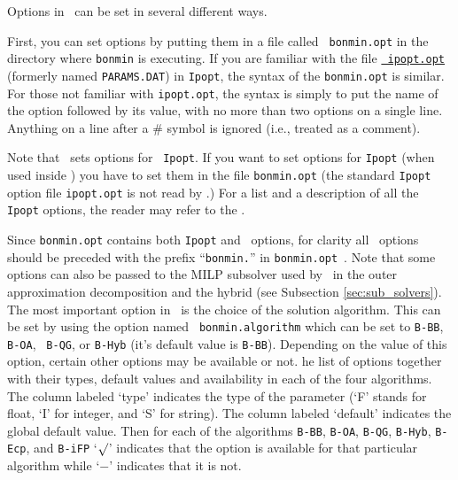 
\begin{PageSummary}
\end{PageSummary}


Options in \Bonmin\ can be set in several different ways.

First, you can set options by putting them in a file called {\tt
bonmin.opt} in the directory where {\tt bonmin} is executing. If you
are familiar with the file
\href{\IpoptDoc{34}}{\tt
ipopt.opt} (formerly named {\tt PARAMS.DAT}) in {\tt Ipopt}, the
syntax of the {\tt bonmin.opt} is similar. For those not familiar
with {\tt ipopt.opt}, the syntax is simply to put the name of the
option followed by its value, with no more than two options on a
single line. Anything on a line after a \# symbol is ignored (i.e.,
treated as a comment).

Note that \Bonmin\ sets options for {\tt
Ipopt}. If you want to set options for {\tt Ipopt} (when used inside \Bonmin) you have to set them
in the file {\tt bonmin.opt} (the standard {\tt Ipopt} option file {\tt ipopt.opt}
is not read by \Bonmin.)
For a list and a description of all the {\tt Ipopt} options, the
reader may refer to the
.

Since {\tt bonmin.opt} contains both {\tt Ipopt} and \Bonmin\ options, for clarity
all \Bonmin\ options should be preceded with the prefix ``{\tt bonmin.}'' in {\tt bonmin.opt}~.
Note that some options can also be passed to the MILP subsolver used by \Bonmin\
in the outer approximation decomposition
and the hybrid (see Subsection \ref{sec:sub_solvers}).\\

The most important option in \Bonmin\ is the choice of the solution
algorithm. This can be set by using the option named {\tt
bonmin.algorithm} which can be set to {\tt B-BB}, {\tt B-OA}, {\tt
B-QG}, or {\tt B-Hyb} (it's default value is {\tt B-BB}). Depending
on the value of this option, certain other options may be available
or not. \latexhtml{Table \ref{tab:options} gives t}{T}he list of options together
with their types, default values and availability in each of the
four algorithms. The column labeled `type' indicates the type of the
parameter (`F' stands for float, `I' for integer, and `S' for
string). The column labeled `default' indicates the global default
value. Then for each of the algorithms {\tt B-BB}, {\tt B-OA},
{\tt B-QG}, {\tt B-Hyb}, {\tt B-Ecp}, and {\tt B-iFP} `$\surd$' indicates that the option is
available for that particular algorithm
while `$-$' indicates that it is not.\\

